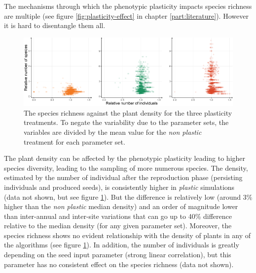 The mechanisms through which the phenotypic plasticity impacts species richness are multiple (see figure \ref{fig:plasticity-effect} in chapter \ref{part:literature}). However it is hard to disentangle them all.




\begin{figure}%
    \includegraphics[width=1\linewidth]{./2_PP/Figures/Comm/comm_n_sp_n_indiv3.png}%
  \caption[The species richness relative to the plant density]{The species richness against the plant density for the three plasticity treatments. To negate the variability due to the parameter sets, the variables are divided by the mean value for the \textit{non plastic} treatment for each parameter set.}
  \label{fig:species_per_plant}
\end{figure}

The plant density can be affected by the phenotypic plasticity leading to higher species diversity\parencite{lepik_high_2005}, leading to the sampling of more numerous species. The density, estimated by the number of individual after the reproduction phase (persisting individuals and produced seeds), is consistently higher in \textit{plastic} simulations (data not shown, but see figure \ref{fig:species_per_plant}). But the difference is relatively low (around 3\% higher than the \textit{non plastic} median density) and an order of magnitude lower than inter-annual and inter-site variations that can go up to 40\% difference relative to the median density (for any given parameter set). Moreover, the species richness shows no evident relationship with the density of plants in any of the algorithms (see figure \ref{fig:species_per_plant}). In addition, the number of individuals is greatly depending on the seed input parameter (strong linear correlation), but this parameter has no consistent effect on the species richness (data not shown).


